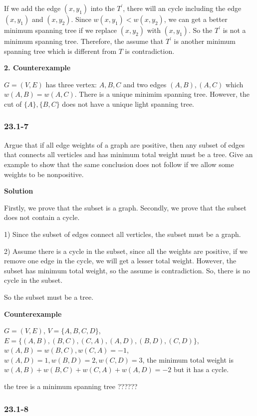 If we add the edge $(x, y_1)$ into the $T^{'}$, there will an cycle including
the edge $(x, y_1)$ and $(x, y_2)$. Since $w(x, y_1) < w(x, y_2)$, we can get
a better minimum spanning tree if we replace $(x, y_2)$ with $(x, y_1)$. So the
$T^{'}$ is not a minimum spanning tree. Therefore, the assume that $T^{'}$ is
another minimum spanning tree which is different from $T$ is contradiction.

\textbf{2. Counterexample}

$G=(V, E)$ has three vertex: $A, B, C$ and two edges $(A, B), (A, C)$ which
$w(A, B) = w(A, C)$. There is a unique minimim spanning tree. However, the cut
of $\{A\}, \{B, C\}$ does not have a unique light spanning tree.

\subsubsection {23.1-7}

Argue that if all edge weights of a graph are positive, then any subset of edges
that connects all verticles and has minimum total weight must be a tree. Give an
example to show that the same conclusion does not follow if we allow some
weights to be nonpositive.

\textbf{Solution}

Firstly, we prove that the subset is a graph. Secondly, we prove that the subset
does not contain a cycle.

1) Since the subset of edges connect all verticles, the subset must be a graph.

2) Assume there is a cycle in the subset, since all the weights are positive,
if we remove one edge in the cycle, we will get a lesser total weight. However,
the subset has minimum total weight, so the assume is contradiction. So, there
is no cycle in the subset.

So the subset must be a tree.

\textbf{Counterexample}

$G = (V, E)$, $V = \{ A, B, C, D \}$,
$E = \{ (A, B), (B, C), (C, A), (A, D), (B, D), (C, D) \}$,
$w(A, B) = w(B, C), w(C, A) = -1$, $w(A, D) = 1, w(B, D) = 2, w(C, D) = 3$, the
minimum total weight is $w(A, B) + w(B, C) + w(C, A) + w(A, D) = -2$ but it has
a cycle.


{\color{red}the tree is a minimum spanning tree ??????}


\subsubsection {23.1-8}

